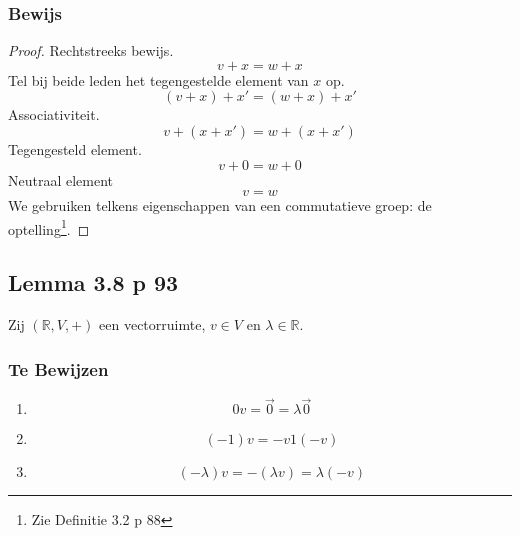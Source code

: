\documentclass[lineaire_algebra_oplossingen.tex]{subfiles}
\begin{document}
\subsubsection*{Bewijs}
\begin{proof}
Rechtstreeks bewijs.\\
\[
v+x = w+x
\]
Tel bij beide leden het tegengestelde element van $x$ op.
\[
(v+x)+x' = (w+x)+x'
\]
Associativiteit.
\[
v + (x+x') = w+(x+x')
\]
Tegengesteld element.
\[
v + 0 = w+0
\]
Neutraal element
\[
v = w
\]
We gebruiken telkens eigenschappen van een commutatieve groep: de optelling\footnote{Zie Definitie 3.2 p 88}.
\end{proof}


\subsection{Lemma 3.8 p 93}
\label{3.8}
Zij $(\mathbb{R},V,+)$ een vectorruimte, $v\in V$ en $\lambda \in \mathbb{R}$.

\subsubsection*{Te Bewijzen}
\begin{enumerate}
\item
\[
0v = \vec{0} = \lambda\vec{0}
\]
\item
\[
(-1)v = -v 1(-v)
\]
\item
\[
(-\lambda)v = -(\lambda v ) = \lambda(-v)
\]
\end{enumerate}
\end{document}
